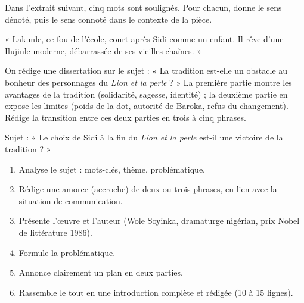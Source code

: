 \documentclass[11pt]{article}
\newcounter{popsec}
\newcounter{popsub}
\newcommand{\courssub}[1]{%
  \stepcounter{popsub}%
  \par\vspace{9pt}\noindent{\popxbold\fontsize{11.5}{13}\selectfont\color{popink}{\color{poporange}\thepopsec.\thepopsub}\hspace{6pt}#1}\par\nopagebreak\vspace{4pt}
}
\begin{document}
\begin{exercice}
Dans l'extrait suivant, cinq mots sont soulignés. Pour chacun, donne le sens dénoté, puis le sens connoté dans le contexte de la pièce.

« Lakunle, ce \underline{fou} de l'\underline{école}, court après Sidi comme un \underline{enfant}. Il rêve d'une Ilujinle \underline{moderne}, débarrassée de ses vieilles \underline{chaînes}. »
\end{exercice}

\begin{exercice}
On rédige une dissertation sur le sujet : « La tradition est-elle un obstacle au bonheur des personnages du \emph{Lion et la perle} ? » La première partie montre les avantages de la tradition (solidarité, sagesse, identité) ; la deuxième partie en expose les limites (poids de la dot, autorité de Baroka, refus du changement). Rédige la transition entre ces deux parties en trois à cinq phrases.
\end{exercice}

\courssub{Je me prépare au Bac}

\begin{exercice}
Sujet : « Le choix de Sidi à la fin du \emph{Lion et la perle} est-il une victoire de la tradition ? »
\begin{enumerate}
\item Analyse le sujet : mots-clés, thème, problématique.
\item Rédige une amorce (accroche) de deux ou trois phrases, en lien avec la situation de communication.
\item Présente l'œuvre et l'auteur (Wole Soyinka, dramaturge nigérian, prix Nobel de littérature 1986).
\item Formule la problématique.
\item Annonce clairement un plan en deux parties.
\item Rassemble le tout en une introduction complète et rédigée (10 à 15 lignes).
\end{enumerate}
\end{exercice}
\end{document}
